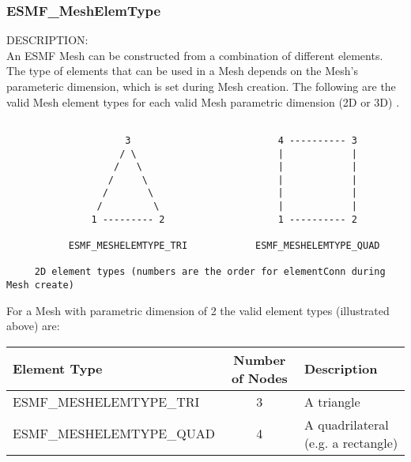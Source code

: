 
\subsubsection{ESMF\_MeshElemType}
\label{sec:mesh:opt:elemtype}

 {\sf DESCRIPTION:\\}
 An ESMF Mesh can be constructed from a combination of different elements. The type of elements that can
be used in a Mesh depends on the Mesh's parameteric dimension, which is set during Mesh creation. The
following are the valid Mesh element types for each valid Mesh parametric dimension (2D or 3D) .

\medskip

\begin{verbatim}

                     3                          4 ---------- 3
                    / \                         |            |  
                   /   \                        |            |
                  /     \                       |            |
                 /       \                      |            |
                /         \                     |            |
               1 --------- 2                    1 ---------- 2

           ESMF_MESHELEMTYPE_TRI            ESMF_MESHELEMTYPE_QUAD

     2D element types (numbers are the order for elementConn during Mesh create)

\end{verbatim}

For a Mesh with parametric dimension of 2 the valid element types (illustrated above) are:

\smallskip

\begin{tabular}{|l|c|l|}
\hline
Element Type &  Number of Nodes  & Description \\
\hline
ESMF\_MESHELEMTYPE\_TRI  & 3 & A triangle \\
ESMF\_MESHELEMTYPE\_QUAD & 4 & A quadrilateral (e.g. a rectangle) \\
\hline
\end{tabular}

\medskip
\medskip

